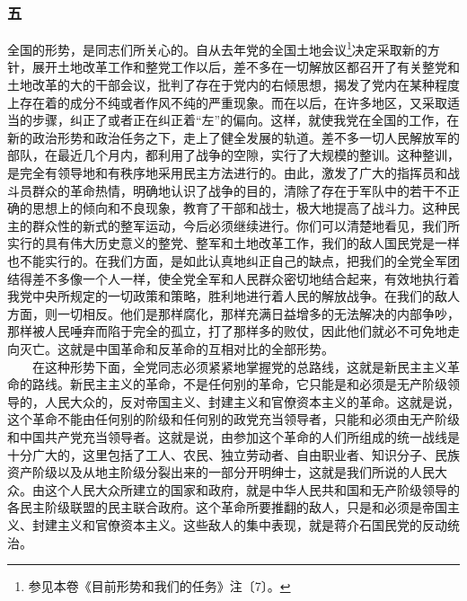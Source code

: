 \documentclass[cn,11pt,chinese]{elegantbook}
\def\myformat#1{\hfil\hfil #1}
\begin{document}
\subsubsection*{\myformat{五}}
全国的形势，是同志们所关心的。自从去年党的全国土地会议\footnote[5]{ 参见本卷《目前形势和我们的任务》注〔7〕。}决定采取新的方针，展开土地改革工作和整党工作以后，差不多在一切解放区都召开了有关整党和土地改革的大的干部会议，批判了存在于党内的右倾思想，揭发了党内在某种程度上存在着的成分不纯或者作风不纯的严重现象。而在以后，在许多地区，又采取适当的步骤，纠正了或者正在纠正着“左”的偏向。这样，就使我党在全国的工作，在新的政治形势和政治任务之下，走上了健全发展的轨道。差不多一切人民解放军的部队，在最近几个月内，都利用了战争的空隙，实行了大规模的整训。这种整训，是完全有领导地和有秩序地采用民主方法进行的。由此，激发了广大的指挥员和战斗员群众的革命热情，明确地认识了战争的目的，清除了存在于军队中的若干不正确的思想上的倾向和不良现象，教育了干部和战士，极大地提高了战斗力。这种民主的群众性的新式的整军运动，今后必须继续进行。你们可以清楚地看见，我们所实行的具有伟大历史意义的整党、整军和土地改革工作，我们的敌人国民党是一样也不能实行的。在我们方面，是如此认真地纠正自己的缺点，把我们的全党全军团结得差不多像一个人一样，使全党全军和人民群众密切地结合起来，有效地执行着我党中央所规定的一切政策和策略，胜利地进行着人民的解放战争。在我们的敌人方面，则一切相反。他们是那样腐化，那样充满日益增多的无法解决的内部争吵，那样被人民唾弃而陷于完全的孤立，打了那样多的败仗，因此他们就必不可免地走向灭亡。这就是中国革命和反革命的互相对比的全部形势。\\
　　在这种形势下面，全党同志必须紧紧地掌握党的总路线，这就是新民主主义革命的路线。新民主主义的革命，不是任何别的革命，它只能是和必须是无产阶级领导的，人民大众的，反对帝国主义、封建主义和官僚资本主义的革命。这就是说，这个革命不能由任何别的阶级和任何别的政党充当领导者，只能和必须由无产阶级和中国共产党充当领导者。这就是说，由参加这个革命的人们所组成的统一战线是十分广大的，这里包括了工人、农民、独立劳动者、自由职业者、知识分子、民族资产阶级以及从地主阶级分裂出来的一部分开明绅士，这就是我们所说的人民大众。由这个人民大众所建立的国家和政府，就是中华人民共和国和无产阶级领导的各民主阶级联盟的民主联合政府。这个革命所要推翻的敌人，只是和必须是帝国主义、封建主义和官僚资本主义。这些敌人的集中表现，就是蒋介石国民党的反动统治。\\
\end{document}
